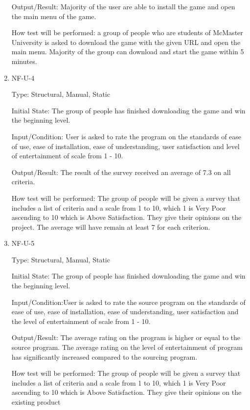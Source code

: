 \documentclass[12pt, titlepage]{article}
\begin{document}
\begin{enumerate}
Output/Result: Majority of the user are able to install the game and open the main menu of the game.
					
How test will be performed: a group of people who are students of McMaster University is asked to download the game with the given URL and open the main menu. Majority of the group can download and start the game within 5 minutes.

\item{NF-U-4\\}

Type: Structural, Manual, Static
					
Initial State: The group of people has finished downloading the game and win the beginning level.

Input/Condition: User is asked to rate the program on the standards of ease of use, ease of installation, ease of understanding, user satisfaction and level of entertainment of scale from 1 - 10.
					
Output/Result: The result of the survey received an average of 7.3 on all criteria.
					
How test will be performed: The group of people will be given a survey that includes a list of criteria and a scale from 1 to 10, which 1 is Very Poor ascending to 10 which is Above Satisfaction. They give their opinions on the project. The average will have remain at least 7 for each criterion. 

\item{NF-U-5\\}

Type: Structural, Manual, Static
					
Initial State: The group of people has finished downloading the game and win the beginning level.

Input/Condition:User is asked to rate the source program on the standards of ease of use, ease of installation, ease of understanding, user satisfaction and the level of entertainment of scale from 1 - 10.
					
Output/Result: The average rating on the program is higher or equal to the source program. The average rating on the level of entertainment of program has significantly increased compared to the sourcing program. 
					
How test will be performed: The group of people will be given a survey that includes a list of criteria and a scale from 1 to 10, which 1 is Very Poor ascending to 10 which is Above Satisfaction. They give their opinions on the existing product
\end{enumerate}
\end{document}
